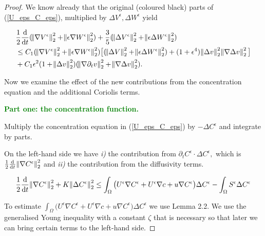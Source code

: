\documentclass[11pt]{article}
\newcommand*\diff{\mathop{}\!\mathrm{d}}
\begin{document}
\begin{proof}

We know already that the original (coloured black) parts of (\ref{U_eps_C_eps}), multiplied by $\Delta V^\epsilon, \Delta W^\epsilon$ yield

\begin{equation} \label{originalH1}
  \begin{split}
    & \frac{1}{2} \frac{\diff}{\diff t} (\norm{\nabla V^\epsilon}^2_2 + \norm{\epsilon \nabla W^\epsilon}^2_2) + \frac{3}{5} (\norm{\Delta V^\epsilon}^2_2 + \norm{\epsilon \Delta W^\epsilon}^2_2) \\
    & \leq C_1 (\norm{\nabla V^\epsilon}^2_2 + \norm{\epsilon \nabla W^\epsilon}^2_2) \big [ (\norm{\Delta V}^2_2 + \norm{\epsilon \Delta W^\epsilon}^2_2) + (1+ \epsilon^4) \norm{\Delta v}^2_2 \norm{\nabla \Delta v}^2_2 \big ] \\
    & + C_1 \epsilon^2 (1 + \norm{\Delta v}^2_2) (\norm{\nabla \partial_t v}^2_2 + \norm{\nabla \Delta v}^2_2).
  \end{split}
\end{equation}

Now we examine the effect of the new contributions from the concentration equation and the additional Coriolis terms.

\textcolor{green}{\textbf{Part one: the concentration function.}}

Multiply the concentration equation in (\ref{U_eps_C_eps}) by $- \Delta C^\epsilon$ and integrate by parts.

On the left-hand side we have \textit{i)} the contribution from $\partial_t C^\epsilon \cdot \Delta C^\epsilon,$ which is $\frac{1}{2}\frac{\diff}{\diff t} \norm{\nabla C^\epsilon}^2_2$ and \textit{ii)} the contribution from the diffusivity terms.

$$ \frac{1}{2}\frac{\diff}{\diff t} \norm{\nabla C^\epsilon}^2_2 + K \norm{\Delta C^\epsilon}_2^2 \leq \int_\Omega \big ( U^\epsilon \nabla C^\epsilon  + U^\epsilon \nabla c+ u \nabla C^\epsilon \big ) \Delta C^\epsilon - \int_\Omega S^\epsilon \Delta C^\epsilon$$

To estimate $\int_\Omega \big ( U^\epsilon \nabla C^\epsilon  + U^\epsilon \nabla c + u \nabla C^\epsilon \big ) \Delta C^\epsilon$ we use Lemma 2.2. 
We use the generalised Young inequality with a constant $\zeta$ that is necessary so that later we can bring certain terms to the left-hand side.


\end{proof}
\end{document}
